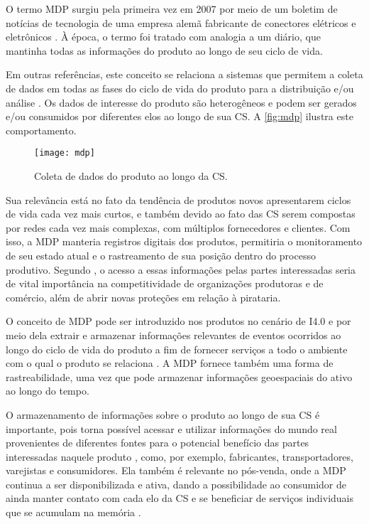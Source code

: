 O termo MDP surgiu pela primeira vez em 2007 por meio de um boletim de notícias de tecnologia de uma empresa alemã fabricante de conectores elétricos e eletrônicos \cite{wahlster2007digitalmemory}. À época, o termo foi tratado com analogia a um diário, que mantinha todas as informações do produto ao longo de seu ciclo de vida.

Em outras referências, este conceito se relaciona a sistemas que permitem a coleta de dados em todas as fases do ciclo de vida do produto para a distribuição e/ou análise \cite{brandherm2011productmemory,blume2014mdp}. Os dados de interesse do produto são heterogêneos e podem ser gerados e/ou consumidos por diferentes elos ao longo de sua CS. A \autoref{fig:mdp} ilustra este comportamento.

\begin{figure}[htb]
	\centering
	\texttt{[image: mdp]}
	\caption{Coleta de dados do produto ao longo da CS.}
	\label{fig:mdp}
\end{figure}

Sua relevância está no fato da tendência de produtos novos apresentarem ciclos de vida cada vez mais curtos, e também devido ao fato das CS serem compostas por redes cada vez mais complexas, com múltiplos fornecedores e clientes. Com isso, a MDP manteria registros digitais dos produtos, permitiria o monitoramento de seu estado atual e o rastreamento de sua posição dentro do processo produtivo. Segundo , o acesso a essas informações pelas partes interessadas seria de vital importância na competitividade de organizações produtoras e de comércio, além de abrir novas proteções em relação à pirataria.

O conceito de MDP pode ser introduzido nos produtos no cenário de I4.0 e por meio dela extrair e armazenar informações relevantes de eventos ocorridos ao longo do ciclo de vida do produto a fim de fornecer serviços a todo o ambiente com o qual o produto se relaciona \cite{brandherm2011productmemory}. A MDP fornece também uma forma de rastreabilidade, uma vez que pode armazenar informações geoespaciais do ativo ao longo do tempo.

O armazenamento de informações sobre o produto ao longo de sua CS é importante, pois torna possível acessar e utilizar informações do mundo real provenientes de diferentes fontes para o potencial benefício das partes interessadas naquele produto \cite{brandherm2011productmemory}, como, por exemplo, fabricantes, transportadores, varejistas e consumidores. Ela também é relevante no pós-venda, onde a MDP continua a ser disponibilizada e ativa, dando a possibilidade ao consumidor de ainda manter contato com cada elo da CS e se beneficiar de serviços individuais que se acumulam na memória \cite{brandherm2011productmemory}.

